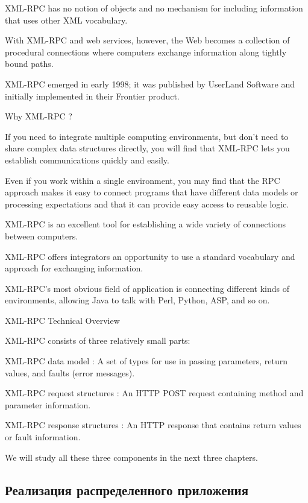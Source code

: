 \documentclass[a4paper,openany,twoside,final]{book}
\begin{document}
    XML-RPC has no notion of objects and no mechanism for including information that uses other XML vocabulary.

    With XML-RPC and web services, however, the Web becomes a collection of procedural connections where computers exchange information along tightly bound paths.

    XML-RPC emerged in early 1998; it was published by UserLand Software and initially implemented in their Frontier product.

Why XML-RPC ?

If you need to integrate multiple computing environments, but don't need to share complex data structures directly, you will find that XML-RPC lets you establish communications quickly and easily.

Even if you work within a single environment, you may find that the RPC approach makes it easy to connect programs that have different data models or processing expectations and that it can provide easy access to reusable logic.

    XML-RPC is an excellent tool for establishing a wide variety of connections between computers.

    XML-RPC offers integrators an opportunity to use a standard vocabulary and approach for exchanging information.

    XML-RPC's most obvious field of application is connecting different kinds of environments, allowing Java to talk with Perl, Python, ASP, and so on.

XML-RPC Technical Overview

XML-RPC consists of three relatively small parts:

    XML-RPC data model : A set of types for use in passing parameters, return values, and faults (error messages).

    XML-RPC request structures : An HTTP POST request containing method and parameter information.

    XML-RPC response structures : An HTTP response that contains return values or fault information.

We will study all these three components in the next three chapters.

\newpage
\subsection{Реализация распределенного приложения}
\label{sec:distrimpl}
\end{document}
